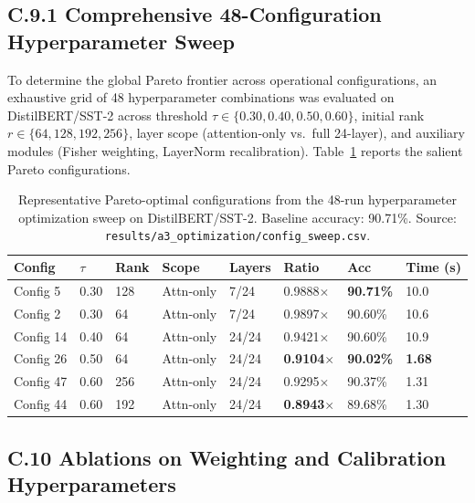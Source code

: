 \subsection{C.9.1 Comprehensive 48-Configuration Hyperparameter Sweep}
\label{sec:app_sweep_data}

To determine the global Pareto frontier across operational configurations, an exhaustive grid of 48 hyperparameter combinations was evaluated on DistilBERT/SST-2 across threshold $\tau \in \{0.30, 0.40, 0.50, 0.60\}$, initial rank $r \in \{64, 128, 192, 256\}$, layer scope (attention-only vs.\ full 24-layer), and auxiliary modules (Fisher weighting, LayerNorm recalibration). Table~\ref{tab:app_sweep_top} reports the salient Pareto configurations.

\begin{table}[H]
\centering
\small
\begin{tabular}{llllllll}
\toprule
\textbf{Config} & $\tau$ & \textbf{Rank} & \textbf{Scope} & \textbf{Layers} & \textbf{Ratio} & \textbf{Acc} & \textbf{Time (s)} \\
\midrule
Config 5  & 0.30 & 128 & Attn-only & 7/24  & 0.9888$\times$ & \textbf{90.71\%} & 10.0 \\
Config 2  & 0.30 & 64  & Attn-only & 7/24  & 0.9897$\times$ & 90.60\% & 10.6 \\
Config 14 & 0.40 & 64  & Attn-only & 24/24 & 0.9421$\times$ & 90.60\% & 10.9 \\
Config 26 & 0.50 & 64  & Attn-only & 24/24 & \textbf{0.9104$\times$} & \textbf{90.02\%} & \textbf{1.68} \\
Config 47 & 0.60 & 256 & Attn-only & 24/24 & 0.9295$\times$ & 90.37\% & 1.31 \\
Config 44 & 0.60 & 192 & Attn-only & 24/24 & \textbf{0.8943$\times$} & 89.68\% & 1.30 \\
\bottomrule
\end{tabular}
\caption{Representative Pareto-optimal configurations from the 48-run hyperparameter optimization sweep on DistilBERT/SST-2. Baseline accuracy: 90.71\%. Source: \texttt{results/a3\_optimization/config\_sweep.csv}.}
\label{tab:app_sweep_top}
\end{table}


\subsection{C.10 Ablations on Weighting and Calibration Hyperparameters}
\label{sec:app_hyperparam_ablations}

